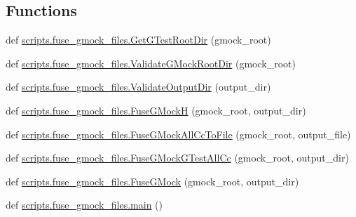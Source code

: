\subsection*{Functions}
\begin{DoxyCompactItemize}
\item 
def \mbox{\hyperlink{namespacescripts_1_1fuse__gmock__files_aaec9da71b23f7103fdd3d03379ed9ab5}{scripts.\+fuse\+\_\+gmock\+\_\+files.\+Get\+G\+Test\+Root\+Dir}} (gmock\+\_\+root)
\item 
def \mbox{\hyperlink{namespacescripts_1_1fuse__gmock__files_aa99dcc999c211d9c7384a5f599839519}{scripts.\+fuse\+\_\+gmock\+\_\+files.\+Validate\+G\+Mock\+Root\+Dir}} (gmock\+\_\+root)
\item 
def \mbox{\hyperlink{namespacescripts_1_1fuse__gmock__files_a8a8a8aee48bb6d3758d0f9f04210d1f8}{scripts.\+fuse\+\_\+gmock\+\_\+files.\+Validate\+Output\+Dir}} (output\+\_\+dir)
\item 
def \mbox{\hyperlink{namespacescripts_1_1fuse__gmock__files_adf0e7c53849e827c73b1d594fcbcd2b4}{scripts.\+fuse\+\_\+gmock\+\_\+files.\+Fuse\+G\+MockH}} (gmock\+\_\+root, output\+\_\+dir)
\item 
def \mbox{\hyperlink{namespacescripts_1_1fuse__gmock__files_aa4ad92785274676c45dc98f2357c8d44}{scripts.\+fuse\+\_\+gmock\+\_\+files.\+Fuse\+G\+Mock\+All\+Cc\+To\+File}} (gmock\+\_\+root, output\+\_\+file)
\item 
def \mbox{\hyperlink{namespacescripts_1_1fuse__gmock__files_a68cbef9add80c9b8bafe11968456167e}{scripts.\+fuse\+\_\+gmock\+\_\+files.\+Fuse\+G\+Mock\+G\+Test\+All\+Cc}} (gmock\+\_\+root, output\+\_\+dir)
\item 
def \mbox{\hyperlink{namespacescripts_1_1fuse__gmock__files_aa846dc5f0327e526e223109d534d5153}{scripts.\+fuse\+\_\+gmock\+\_\+files.\+Fuse\+G\+Mock}} (gmock\+\_\+root, output\+\_\+dir)
\item 
def \mbox{\hyperlink{namespacescripts_1_1fuse__gmock__files_aedb6e9c7e3b6b0e773d6a91ccd460d03}{scripts.\+fuse\+\_\+gmock\+\_\+files.\+main}} ()
\end{DoxyCompactItemize}
